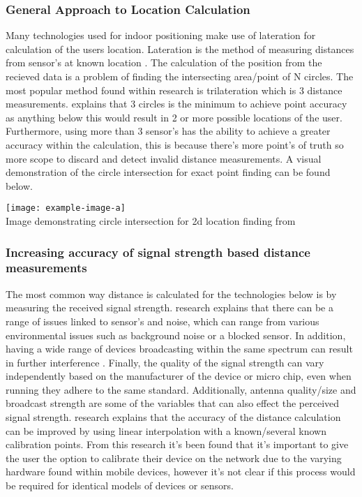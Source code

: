 \subsubsection{General Approach to Location Calculation}
Many technologies used for indoor positioning make use of lateration for calculation of the users location. Lateration is the method of measuring distances from sensor's at known location \citetemp. The calculation of the position from the recieved data is a problem of finding the intersecting area/point of N circles. The most popular method found within research is trilateration which is 3 distance measurements. \citetemp explains that 3 circles is the minimum to achieve point accuracy as anything below this would result in 2 or more possible locations of the user. Furthermore, using more than 3 sensor's has the ability to achieve a greater accuracy within the calculation, this is because there's more point's of truth so more scope to discard and detect invalid distance measurements. A visual demonstration of the circle intersection for exact point finding can be found below.

\begin{center}
	\texttt{[image: example-image-a]}\\
	Image demonstrating circle intersection for 2d location finding from \citetemp
\end{center}

\subsubsection{Increasing accuracy of signal strength based distance measurements}
The most common way distance is calculated for the technologies below is by measuring the received signal strength. \citetemp research explains that there can be a range of issues linked to sensor's and noise, which can range from various environmental issues such as background noise or a blocked sensor. In addition, having a wide range of devices broadcasting within the same spectrum can result in further interference \citetemp. Finally, the quality of the  signal strength can vary independently based on the manufacturer of the device or micro chip, even when running they adhere to the same standard. Additionally, antenna quality/size and broadcast strength are some of the variables that can also effect the perceived signal strength. \citetemp research explains that the accuracy of the distance calculation can be improved by using linear interpolation with a known/several known calibration points. From this research it's been found that it's important to give the user the option to calibrate their device on the network due to the varying hardware found within mobile devices, however it's not clear if this process would be required for identical models of devices or sensors.\\

